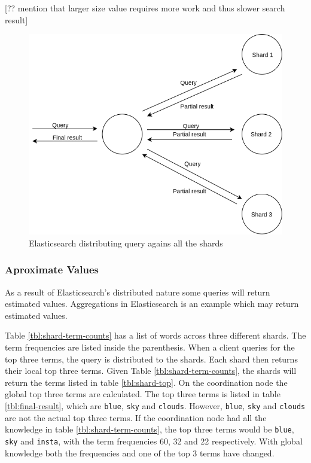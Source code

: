 [?? mention that larger size value requires more work and thus slower search result]

\begin{figure}[h]
  \centering
  \includegraphics[width=0.9\linewidth]{img/elasticsearch-sharding.png}
  \caption{Elasticsearch distributing query agains all the shards}
  \label{fig:elasticsearch-sharding}
\end{figure}

\subsubsection{Aproximate Values}
As a result of Elasticsearch's distributed nature some queries will return estimated values.
Aggregations in Elasticsearch is an example which may return estimated values.

Table \ref{tbl:shard-term-counts} has a list of words across three different shards.
The term frequencies are listed inside the parenthesis.
When a client queries for the top three terms, the query is distributed to the shards.
Each shard then returns their local top three terms.
Given Table \ref{tbl:shard-term-counts},
the shards will return the terms listed in table \ref{tbl:shard-top}.
On the coordination node the global top three terms are calculated.
The top three terms is listed in table \ref{tbl:final-result}, which are \texttt{blue}, \texttt{sky} and \texttt{clouds}.
However, \texttt{blue}, \texttt{sky} and \texttt{clouds} are not the actual top three terms.
If the coordination node had all the knowledge in table \ref{tbl:shard-term-counts},
the top three terms would be \texttt{blue}, \texttt{sky} and \texttt{insta},
with the term frequencies 60, 32 and 22 respectively.
With global knowledge both the frequencies and one of the top 3 terms have changed.


